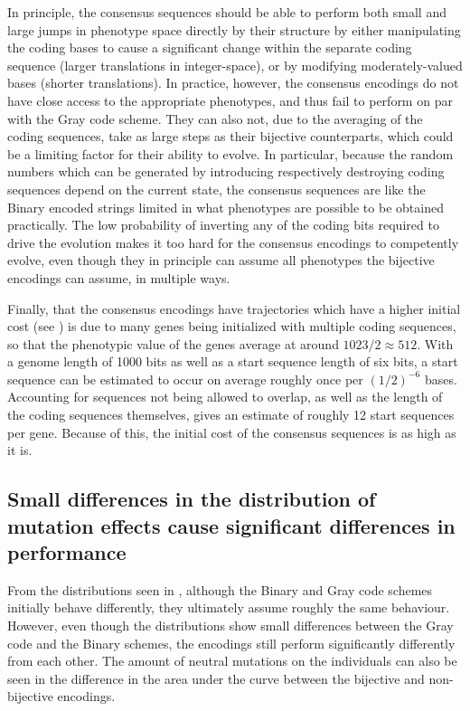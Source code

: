 \documentclass[a4paper,12pt]{article}
\theoremstyle{plain}
\theoremstyle{definition}
\begin{document}
      In principle, the consensus sequences should be able to
      perform both small and large jumps in phenotype space directly by their
      structure by either manipulating the coding bases to cause a significant change
      within the separate coding sequence (larger translations in integer-space),
      or by modifying moderately-valued bases (shorter translations). 
      In practice, however, the consensus encodings do not have close access to the appropriate
      phenotypes, and thus fail to perform on par with the Gray code scheme. They can also not, due to the
      averaging of the coding sequences, take as large steps as their
      bijective counterparts, which could be a limiting factor for their ability
      to evolve. In particular, because the random numbers which can be
      generated by introducing respectively destroying coding sequences depend
      on the current state, the consensus sequences are like the Binary encoded
      strings limited in what phenotypes are possible to be obtained practically. The low probability of
      inverting any of the coding bits required to drive the evolution 
      makes it too hard for the consensus encodings to competently evolve, even
      though they in principle can assume all phenotypes the bijective encodings
      can assume, in multiple ways.
      
      Finally, that the consensus encodings have trajectories which have a
      higher initial cost (see ) is due to many 
      genes being initialized with multiple coding sequences,
      so that the phenotypic value of the genes average at around $1023/2 
      \approx 512$. With a genome length of 1000 bits as well as a start
      sequence length of six bits, a start sequence can be estimated to occur on
      average roughly once per $(1/2)^{-6}$ bases. Accounting for sequences not being
      allowed to overlap, as well as the length of the coding sequences themselves,
      gives an estimate of roughly 12 start sequences per gene. Because of this,
      the initial cost of the consensus sequences is as high as it is. 

   \subsection{Small differences in the distribution of mutation effects cause significant
      differences in performance}
      From the distributions seen in , although the Binary and Gray 
      code schemes initially behave differently, they ultimately assume roughly the same behaviour.
      However, even though the distributions show small differences between the
      Gray code and the Binary schemes, the encodings still perform significantly
      differently from each other.
      The amount of neutral mutations on the individuals can also be seen in the
      difference in the area under the curve between the bijective and
      non-bijective encodings. 
      
\end{document}
